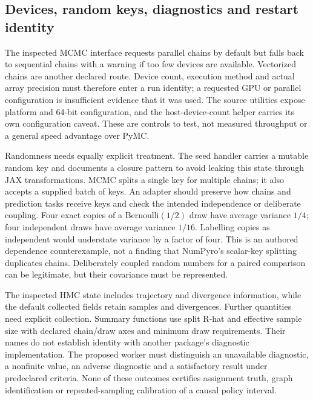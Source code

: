 \subsection{Devices, random keys, diagnostics and restart identity}

The inspected MCMC interface requests parallel chains by default but falls back to sequential chains with a warning if too few devices are available. Vectorized chains are another declared route. Device count, execution method and actual array precision must therefore enter a run identity; a requested GPU or parallel configuration is insufficient evidence that it was used. The source utilities expose platform and 64-bit configuration, and the host-device-count helper carries its own configuration caveat. These are controls to test, not measured throughput or a general speed advantage over PyMC. \cite{exec23_numpyro_sources}

Randomness needs equally explicit treatment. The seed handler carries a mutable random key and documents a closure pattern to avoid leaking this state through JAX transformations. MCMC splits a single key for multiple chains; it also accepts a supplied batch of keys. An adapter should preserve how chains and prediction tasks receive keys and check the intended independence or deliberate coupling. Four exact copies of a Bernoulli$(1/2)$ draw have average variance $1/4$; four independent draws have average variance $1/16$. Labelling copies as independent would understate variance by a factor of four. This is an authored dependence counterexample, not a finding that NumPyro's scalar-key splitting duplicates chains. Deliberately coupled random numbers for a paired comparison can be legitimate, but their covariance must be represented. \cite{exec23_numpyro_sources,exec23_numpyro_reference}

The inspected HMC state includes trajectory and divergence information, while the default collected fields retain samples and divergences. Further quantities need explicit collection. Summary functions use split R-hat and effective sample size with declared chain/draw axes and minimum draw requirements. Their names do not establish identity with another package's diagnostic implementation. The proposed worker must distinguish an unavailable diagnostic, a nonfinite value, an adverse diagnostic and a satisfactory result under predeclared criteria. None of these outcomes certifies assignment truth, graph identification or repeated-sampling calibration of a causal policy interval. \cite{exec23_numpyro_sources}

